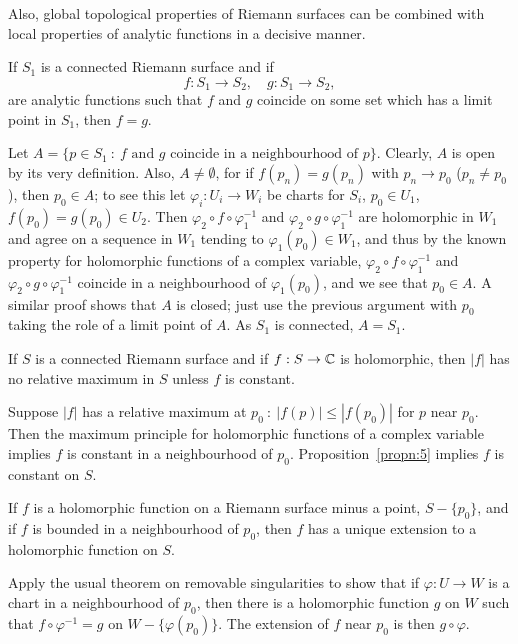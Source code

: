 \documentclass[a4paper,11pt]{article}
\begin{document}
Also, global topological properties of Riemann surfaces can be
combined with local properties of analytic functions in a decisive
manner.

\begin{propn}
  \label{propn:5}
  If $S_1$ is a connected Riemann surface and if
  $$
  f : S_1 \to S_2,\quad g : S_1 \to S_2,
  $$
  are analytic functions such that $f$ and $g$ coincide on some set
  which has a limit point in $S_1$, then $f = g$.
\end{propn}
\begin{myproof}
  Let $A = \{ p \in S_1 ~:~ f\text{ and }g\text{ coincide in a
    neighbourhood of }p\}$.  Clearly, $A$ is open by its very
  definition.  Also, $A \ne \emptyset$, for if $f(p_n) = g(p_n)$ with
  $p_n \to p_0$ ($p_n \ne p_0$), then $p_0 \in A$; to see this let
  $\varphi_i : U_i \to W_i$ be charts for $S_i$, $p_0 \in U_1$,
  $f(p_0) = g(p_0) \in U_2$.  Then $\varphi_2 \circ f \circ
  \varphi_1^{-1}$ and $\varphi_2 \circ g \circ \varphi_1^{-1}$ are
  holomorphic in $W_1$ and agree on a sequence in $W_1$ tending to
  $\varphi_1(p_0) \in W_1$, and thus by the known property for
  holomorphic functions of a complex variable, $\varphi_2 \circ f
  \circ \varphi_1^{-1}$ and $\varphi_2 \circ g \circ \varphi_1^{-1}$
  coincide in a neighbourhood of $\varphi_1(p_0)$, and we see that
  $p_0 \in A$.  A similar proof shows that $A$ is closed; just use the
  previous argument with $p_0$ taking the role of a limit point of
  $A$.  As $S_1$ is connected, $A = S_1$.
\end{myproof}

\begin{propn}
  \label{propn:6}
  If $S$ is a connected Riemann surface and if $f : S \to {\mathbb C}$ is
  holomorphic, then $|f|$ has no relative maximum in $S$ unless $f$ is
  constant.
\end{propn}
\begin{myproof}
  Suppose $|f|$ has a relative maximum at $p_0 ~:~ |f(p)| \le
  |f(p_0)|$ for $p$ near $p_0$.  Then the maximum principle for
  holomorphic functions of a complex variable implies $f$ is constant
  in a neighbourhood of $p_0$.  Proposition~\ref{propn:5} implies $f$
  is constant on $S$.
\end{myproof}

\begin{propn}
  \label{propn:7}
  If $f$ is a holomorphic function on a Riemann surface minus a point,
  $S - \{p_0\}$, and if $f$ is bounded in a neighbourhood of $p_0$,
  then $f$ has a unique extension to a holomorphic function on $S$.
\end{propn}
\begin{myproof}
  Apply the usual theorem on removable singularities to show that if
  $\varphi : U \to W$ is a chart in a neighbourhood of $p_0$, then
  there is a holomorphic function $g$ on $W$ such that $f \circ
  \varphi^{-1} = g$ on $W - \{\varphi(p_0)\}$.  The extension of $f$
  near $p_0$ is then $g \circ \varphi$.
\end{myproof}
\end{document}
